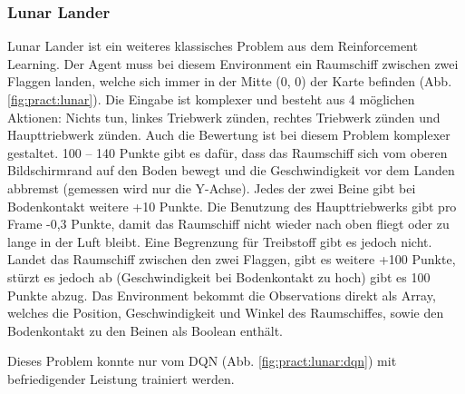 \documentclass[12pt,a4paper]{article}
\begin{document}
\subsubsection{Lunar Lander}
Lunar Lander ist ein weiteres klassisches Problem aus dem Reinforcement Learning.
Der Agent muss bei diesem Environment ein Raumschiff zwischen zwei Flaggen landen, welche sich immer in der Mitte (0, 0) der Karte befinden (Abb. \ref{fig:pract:lunar}).
Die Eingabe ist komplexer und besteht aus 4 möglichen Aktionen: Nichts tun, linkes Triebwerk zünden, rechtes Triebwerk zünden und Haupttriebwerk zünden.
Auch die Bewertung ist bei diesem Problem komplexer gestaltet.
100 -- 140 Punkte gibt es dafür, dass das Raumschiff sich vom oberen Bildschirmrand auf den Boden bewegt und die Geschwindigkeit vor dem Landen abbremst (gemessen wird nur die Y-Achse).
Jedes der zwei Beine gibt bei Bodenkontakt weitere +10 Punkte.
Die Benutzung des Haupttriebwerks gibt pro Frame -0,3 Punkte, damit das Raumschiff nicht wieder nach oben fliegt oder zu lange in der Luft bleibt.
Eine Begrenzung für Treibstoff gibt es jedoch nicht.
Landet das Raumschiff zwischen den zwei Flaggen, gibt es weitere +100 Punkte, stürzt es jedoch ab (Geschwindigkeit bei Bodenkontakt zu hoch) gibt es 100 Punkte abzug.
Das Environment bekommt die Observations direkt als Array, welches die Position, Geschwindigkeit und Winkel des Raumschiffes, sowie den Bodenkontakt zu den Beinen als Boolean enthält.

Dieses Problem konnte nur vom DQN (Abb. \ref{fig:pract:lunar:dqn}) mit befriedigender Leistung trainiert werden. 
\end{document}
